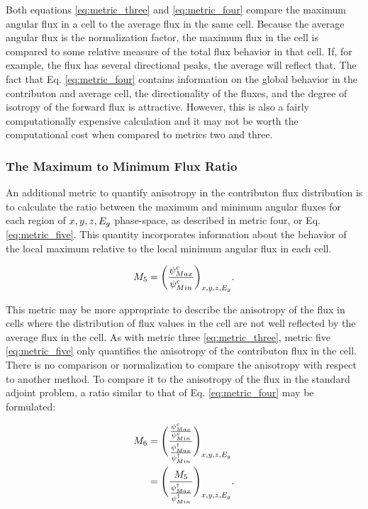 Both equations \ref{eq:metric_three} and \ref{eq:metric_four} compare the maximum
angular flux in a cell to the average flux in the same cell. Because the average
angular flux is the normalization factor, the maximum flux in the cell is
compared to some relative measure of the total flux behavior in that cell. If,
for example, the flux has several directional peaks, the average will reflect
that.
The fact that Eq. \ref{eq:metric_four} contains information on the global
behavior in the contributon and average cell, the directionality of the fluxes,
and the degree of isotropy of the forward flux is attractive. However,
this is also a fairly computationally expensive calculation and it may
not be worth the computational cost when compared to metrics two and three.

\subsubsection{The Maximum to Minimum Flux Ratio}

An additional metric to quantify anisotropy in the contributon flux distribution
is to calculate the ratio between the maximum and minimum angular fluxes for
each region of $x,y,z,E_g$ phase-space, as described in metric
four, or Eq. \ref{eq:metric_five}. This
quantity incorporates information about the
behavior of the local maximum relative to the local
minimum angular flux in each cell.

\begin{equation}
  M_{5} = \bigg(\frac{\psi^{c}_{Max}}{\psi^{c}_{
          Min}}\bigg)_{x,y,z,E_g}  .
  \label{eq:metric_five}
\end{equation}

This metric may be more appropriate to describe the anisotropy of the flux in
cells where the distribution of flux values in the cell are not well
reflected by the average flux in the cell. As with metric three \eqref{eq:metric_three}, metric five
\eqref{eq:metric_five} only quantifies
the anisotropy of the contributon flux in the cell. There is no comparison or
normalization to compare the anisotropy with respect to another method. To
compare it to the anisotropy of the flux in the standard adjoint
problem, a ratio similar to that of Eq. \ref{eq:metric_four} may be
formulated:

\begin{equation}
  \begin{split}
    M_{6} & = \Bigg( \frac{\frac{\psi^{c}_{Max}}{\psi^{c}_{
                  Min}}}{\frac{\psi^{\dagger}_{
                  Max}}{\psi^{\dagger}_{Min}}} \Bigg)_{x,y,z,E_g} \\
          & = \Bigg(\frac{M_{5}}{\frac{\psi^{\dagger}_{Max}}
                  {\psi^{\dagger}_{Min}}} \Bigg)_{x,y,z,E_g}  .
  \end{split}
  \label{eq:metric_six}
\end{equation}

